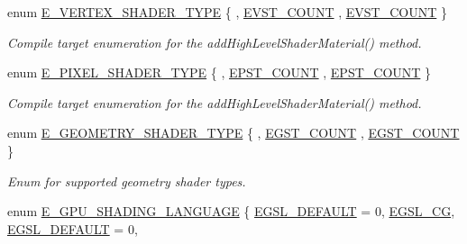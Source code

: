 \begin{DoxyCompactItemize}
\item 
enum \hyperlink{namespaceirr_1_1video_a9decae50d4dc2455e7b009f5c71b24f9}{E\+\_\+\+V\+E\+R\+T\+E\+X\+\_\+\+S\+H\+A\+D\+E\+R\+\_\+\+T\+Y\+PE} \{ , \hyperlink{namespaceirr_1_1video_a9decae50d4dc2455e7b009f5c71b24f9a21617defc2d16ecc136809cdc15c4039}{E\+V\+S\+T\+\_\+\+C\+O\+U\+NT}
, \hyperlink{namespaceirr_1_1video_a9decae50d4dc2455e7b009f5c71b24f9a21617defc2d16ecc136809cdc15c4039}{E\+V\+S\+T\+\_\+\+C\+O\+U\+NT}
 \}\begin{DoxyCompactList}\small\item\em Compile target enumeration for the add\+High\+Level\+Shader\+Material() method. \end{DoxyCompactList}
\item 
enum \hyperlink{namespaceirr_1_1video_a07fb77e9aec681402ad376f7ef9b724c}{E\+\_\+\+P\+I\+X\+E\+L\+\_\+\+S\+H\+A\+D\+E\+R\+\_\+\+T\+Y\+PE} \{ , \hyperlink{namespaceirr_1_1video_a07fb77e9aec681402ad376f7ef9b724cae6fecb0d5236814bd0ee7e70800f500f}{E\+P\+S\+T\+\_\+\+C\+O\+U\+NT}
, \hyperlink{namespaceirr_1_1video_a07fb77e9aec681402ad376f7ef9b724cae6fecb0d5236814bd0ee7e70800f500f}{E\+P\+S\+T\+\_\+\+C\+O\+U\+NT}
 \}\begin{DoxyCompactList}\small\item\em Compile target enumeration for the add\+High\+Level\+Shader\+Material() method. \end{DoxyCompactList}
\item 
enum \hyperlink{namespaceirr_1_1video_a3aad41cbdf894faaeeadf465592af18f}{E\+\_\+\+G\+E\+O\+M\+E\+T\+R\+Y\+\_\+\+S\+H\+A\+D\+E\+R\+\_\+\+T\+Y\+PE} \{ , \hyperlink{namespaceirr_1_1video_a3aad41cbdf894faaeeadf465592af18fa12b7af3b4df6db3a325710c1e5ab5273}{E\+G\+S\+T\+\_\+\+C\+O\+U\+NT}
, \hyperlink{namespaceirr_1_1video_a3aad41cbdf894faaeeadf465592af18fa12b7af3b4df6db3a325710c1e5ab5273}{E\+G\+S\+T\+\_\+\+C\+O\+U\+NT}
 \}\begin{DoxyCompactList}\small\item\em Enum for supported geometry shader types. \end{DoxyCompactList}
\item 
enum \hyperlink{namespaceirr_1_1video_a913671e32f20f13e51336bfbe20a82a3}{E\+\_\+\+G\+P\+U\+\_\+\+S\+H\+A\+D\+I\+N\+G\+\_\+\+L\+A\+N\+G\+U\+A\+GE} \{ \hyperlink{namespaceirr_1_1video_a913671e32f20f13e51336bfbe20a82a3a3eebb0c52e3bcfee28013cfb518b4ea9}{E\+G\+S\+L\+\_\+\+D\+E\+F\+A\+U\+LT} = 0, 
\hyperlink{namespaceirr_1_1video_a913671e32f20f13e51336bfbe20a82a3a201c8a8056366df5a7f69f86ad599e01}{E\+G\+S\+L\+\_\+\+CG}, 
\hyperlink{namespaceirr_1_1video_a913671e32f20f13e51336bfbe20a82a3a3eebb0c52e3bcfee28013cfb518b4ea9}{E\+G\+S\+L\+\_\+\+D\+E\+F\+A\+U\+LT} = 0, 

\end{DoxyCompactItemize}
